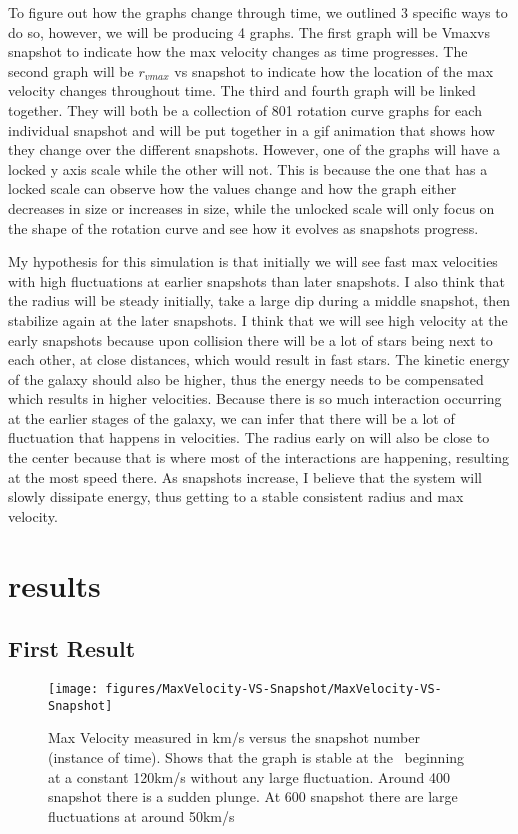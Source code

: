 \documentclass[modern]{aastex61}
\begin{document}
To figure out how the graphs change through time, we outlined 3 specific ways to do so, however, we will be producing 4 graphs. The first graph will be Vmaxvs snapshot to indicate how the max velocity changes as time progresses. The second graph will be $r_{vmax}$ vs snapshot to indicate how the location of the max velocity changes throughout time. The third and fourth graph will be linked together. They will both be a collection of 801 rotation curve graphs for each individual snapshot and will be put together in a gif animation that shows how they change over the different snapshots. However, one of the graphs will have a locked y axis scale while the other will not. This is because the one that has a locked scale can observe how the values change and how the graph either decreases in size or increases in size, while the unlocked scale will only focus on the shape of the rotation curve and see how it evolves as snapshots progress. 

My hypothesis for this simulation is that initially we will see fast max velocities with high fluctuations at earlier snapshots than later snapshots. I also think that the radius will be steady initially, take a large dip during a middle snapshot, then stabilize again at the later snapshots. I think that we will see high velocity at the early snapshots because upon collision there will be a lot of stars being next to each other, at close distances, which would result in fast stars. The kinetic energy of the galaxy should also be higher, thus the energy needs to be compensated which results in higher velocities. Because there is so much interaction occurring at the earlier stages of the galaxy, we can infer that there will be a lot of fluctuation that happens in velocities. The radius early on will also be close to the center because that is where most of the interactions are happening, resulting at the most speed there. As snapshots increase, I believe that the system will slowly dissipate energy, thus getting to a stable consistent radius and max velocity. 


\section {results}

\subsection{First Result}
\begin{figure}[h!]
\begin{center}
\texttt{[image: figures/MaxVelocity-VS-Snapshot/MaxVelocity-VS-Snapshot]}
\caption{{Max Velocity measured in km/s versus the snapshot number (instance of
time). Shows that the graph is stable at the~ beginning at a constant
120km/s without any large fluctuation. Around 400 snapshot there is a
sudden plunge. At 600 snapshot there are large fluctuations at around
50km/s
{\label{228264}}%
}}
\end{center}
\end{figure}
\end{document}
